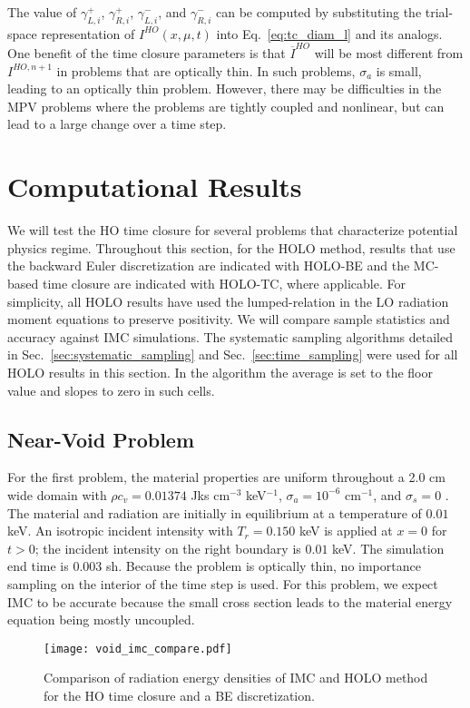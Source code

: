 The value of $\gamma_{L,i}^+$, $\gamma_{R,i}^+$, $\gamma_{L,i}^-$, and $\gamma_{R,i}^-$
can be computed by substituting the trial-space representation of $I^{HO}(x,\mu,t)$ into
Eq.~\eqref{eq:tc_diam_l} and its analogs.
One  benefit of the time closure parameters is that $\overline I^{HO}$ will be
most different from $I^{HO,n+1}$ in problems that are optically thin.  In such problems,
$\sigma_a$ is small, leading to an optically thin problem.  However, there may be
difficulties in the MPV problems where the problems are tightly coupled and nonlinear, but
can lead to a large change over a time step.  

\section{Computational Results}

We will test the HO time closure for several problems that characterize potential physics
regime.  Throughout this
section, for the HOLO method, results that use the backward Euler discretization are indicated with HOLO-BE and the MC-based time
closure are indicated with HOLO-TC, where applicable.  For simplicity, all HOLO results
have used the lumped-relation in the LO radiation moment equations to preserve positivity. We will compare sample statistics
and accuracy against IMC simulations.
The systematic sampling algorithms detailed in Sec.~\ref{sec:systematic_sampling} and
Sec.~\ref{sec:time_sampling} were used for all HOLO results in this
section.  In
the algorithm the average is set to the floor value and slopes to zero in such cells.

\subsection{Near-Void Problem}

For the first problem, the material properties
are uniform throughout a 2.0 cm wide domain with $\rho c_v = 0.01374$ Jks cm$^{-3}$ keV$^{-1}$, $\sigma_a=10^{-6}$ cm$^{-1}$, and $\sigma_s=0$ \invcm.
The material and radiation are initially in equilibrium at a temperature of $0.01$ keV.
An isotropic incident intensity with $T_r = 0.150$ keV is applied
at $x=0$ for $t>0$; the incident intensity on the right boundary is $0.01$ keV.  The simulation end
time is 0.003 sh.  Because the problem is optically thin, no importance sampling on the
interior of the time step is used.   For this problem, we expect IMC to be accurate
because the small cross section leads to the material energy equation being mostly uncoupled.  
\begin{figure}[H]
  \centering
    \texttt{[image: void\_imc\_compare.pdf]}
    \caption{\label{fig:void_imc_compare} Comparison of radiation energy densities of IMC
    and HOLO method for the HO time closure and a BE discretization.}
\end{figure}

